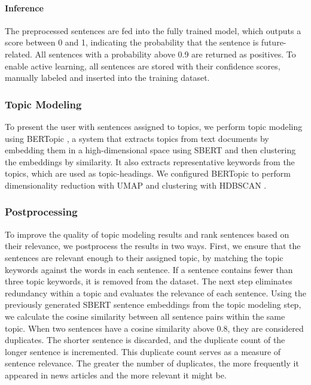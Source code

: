 \documentclass[sigconf]{acmart}
\begin{document}
\paragraph{Inference}
The preprocessed sentences are fed into the fully trained model, which outputs a score between 0 and 1, indicating the probability that the sentence is future-related. All sentences with a probability above 0.9 are returned as positives. To enable active learning, all sentences are stored with their confidence scores, manually labeled and inserted into the training dataset.

\subsubsection{Topic Modeling}
To present the user with sentences assigned to topics, we perform topic modeling using BERTopic \cite{bertopic}, a system that extracts topics from text documents by embedding them in a high-dimensional space using SBERT and then clustering the embeddings by similarity.
It also extracts representative keywords from the topics, which are used as topic-headings. We configured BERTopic to perform dimensionality reduction with UMAP \cite{umap} and clustering with HDBSCAN \cite{hdbscan}.

\subsubsection{Postprocessing}
To improve the quality of topic modeling results and rank sentences based on their relevance, we postprocess the results in two ways.
First, we ensure that the sentences are relevant enough to their assigned topic, by matching the topic keywords against the words in each sentence. If a sentence contains fewer than three topic keywords, it is removed from the dataset.
The next step eliminates redundancy within a topic and evaluates the relevance of each sentence. Using the previously generated SBERT sentence embeddings from the topic modeling step, we calculate the cosine similarity between all sentence pairs within the same topic. When two sentences have a cosine similarity above 0.8, they are considered duplicates. The shorter sentence is discarded, and the duplicate count of the longer sentence is incremented. This duplicate count serves as a measure of sentence relevance. The greater the number of duplicates, the more frequently it appeared in news articles and the more relevant it might be.
\end{document}
